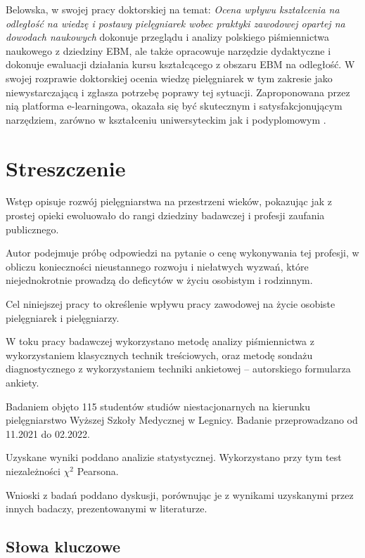 \documentclass[a4paper,12pt,twoside,openright]{mwrep}
\begin{document}
Belowska, w swojej pracy doktorskiej na temat: \textit{Ocena wpływu kształcenia na odległość na wiedzę i postawy pielęgniarek wobec praktyki zawodowej opartej na dowodach naukowych} dokonuje przeglądu i analizy polskiego piśmiennictwa naukowego z dziedziny EBM, ale także opracowuje narzędzie dydaktyczne i dokonuje ewaluacji działania kursu kształcącego z obszaru EBM na odległość. W swojej rozprawie doktorskiej ocenia wiedzę pielęgniarek w tym zakresie jako niewystarczającą i zgłasza potrzebę poprawy tej sytuacji. Zaproponowana przez nią platforma e-learningowa, okazała się być skutecznym i satysfakcjonującym narzędziem, zarówno w kształceniu uniwersyteckim jak i podyplomowym \cite{belowska}.



\chapter*{Streszczenie}


Wstęp opisuje rozwój pielęgniarstwa na przestrzeni wieków, pokazując jak z prostej opieki ewoluowało do rangi dziedziny badawczej i profesji zaufania publicznego. 

Autor podejmuje próbę odpowiedzi na pytanie o cenę wykonywania tej profesji, w obliczu konieczności nieustannego rozwoju i niełatwych wyzwań, które niejednokrotnie prowadzą do deficytów w życiu osobistym i rodzinnym. 

Cel niniejszej pracy to określenie wpływu pracy zawodowej na życie osobiste pielęgniarek i pielęgniarzy.

W toku pracy badawczej wykorzystano metodę analizy piśmiennictwa z wykorzystaniem klasycznych technik treściowych, oraz metodę sondażu diagnostycznego z wykorzystaniem techniki ankietowej – autorskiego formularza ankiety. 

Badaniem objęto 115 studentów studiów niestacjonarnych na kierunku pielęgniarstwo Wyższej Szkoły Medycznej w Legnicy. Badanie przeprowadzano od 11.2021 do 02.2022.

Uzyskane wyniki poddano analizie statystycznej. Wykorzystano przy tym test niezależności $\chi^2$ Pearsona.

Wnioski z badań poddano dyskusji, porównując je z wynikami uzyskanymi przez innych badaczy, prezentowanymi w literaturze.

\vspace{\baselineskip} 

\section*{Słowa kluczowe}
\end{document}
